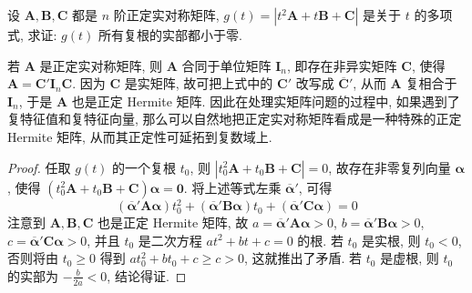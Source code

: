 \documentclass[../../main.tex]{subfiles}
\begin{document}
\begin{example}
设 \(\boldsymbol{A},\boldsymbol{B},\boldsymbol{C}\) 都是 \(n\) 阶正定实对称矩阵, \(g(t)=|t^2\boldsymbol{A}+t\boldsymbol{B}+\boldsymbol{C}|\) 是关于 \(t\) 的多项式, 求证: \(g(t)\) 所有复根的实部都小于零.
\end{example}
\begin{remark}
若 \(\boldsymbol{A}\) 是正定实对称矩阵, 则 \(\boldsymbol{A}\) 合同于单位矩阵 \(\boldsymbol{I}_n\), 即存在非异实矩阵 \(\boldsymbol{C}\), 使得 \(\boldsymbol{A}=\boldsymbol{C}'\boldsymbol{I}_n\boldsymbol{C}\). 因为 \(\boldsymbol{C}\) 是实矩阵, 故可把上式中的 \(\boldsymbol{C}'\) 改写成 \(\overline{\boldsymbol{C}}'\), 从而 \(\boldsymbol{A}\) 复相合于 \(\boldsymbol{I}_n\), 于是 \(\boldsymbol{A}\) 也是正定 Hermite 矩阵. 因此在处理实矩阵问题的过程中, 如果遇到了复特征值和复特征向量, 那么可以自然地把正定实对称矩阵看成是一种特殊的正定 Hermite 矩阵, 从而其正定性可延拓到复数域上. 
\end{remark}
\begin{proof}
任取 \(g(t)\) 的一个复根 \(t_0\), 则 \(|t_0^2\boldsymbol{A}+t_0\boldsymbol{B}+\boldsymbol{C}| = 0\), 故存在非零复列向量 \(\boldsymbol{\alpha}\), 使得 \((t_0^2\boldsymbol{A}+t_0\boldsymbol{B}+\boldsymbol{C})\boldsymbol{\alpha}=\boldsymbol{0}\). 将上述等式左乘 \(\overline{\boldsymbol{\alpha}}'\), 可得
\[(\overline{\boldsymbol{\alpha}}'\boldsymbol{A}\boldsymbol{\alpha})t_0^2+(\overline{\boldsymbol{\alpha}}'\boldsymbol{B}\boldsymbol{\alpha})t_0+(\overline{\boldsymbol{\alpha}}'\boldsymbol{C}\boldsymbol{\alpha}) = 0\]
注意到 \(\boldsymbol{A},\boldsymbol{B},\boldsymbol{C}\) 也是正定 Hermite 矩阵, 故 \(a=\overline{\boldsymbol{\alpha}}'\boldsymbol{A}\boldsymbol{\alpha}>0\), \(b=\overline{\boldsymbol{\alpha}}'\boldsymbol{B}\boldsymbol{\alpha}>0\), \(c=\overline{\boldsymbol{\alpha}}'\boldsymbol{C}\boldsymbol{\alpha}>0\), 并且 \(t_0\) 是二次方程 \(at^2 + bt + c = 0\) 的根. 若 \(t_0\) 是实根, 则 \(t_0<0\), 否则将由 \(t_0\geqslant 0\) 得到 \(at_0^2+bt_0 + c\geqslant  c>0\), 这就推出了矛盾. 若 \(t_0\) 是虚根, 则 \(t_0\) 的实部为 \(-\frac{b}{2a}<0\), 结论得证. 

\end{proof}
\end{document}
